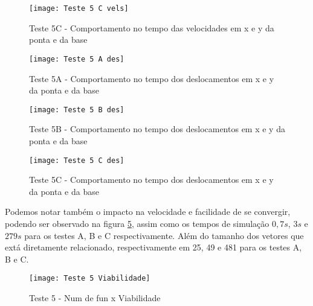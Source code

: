 \begin{figure}[!htb]
    \begin{center}
    \caption{Teste 5C - Comportamento no tempo das velocidades em x e y da ponta e da base}
    \texttt{[image: Teste 5 C vels]}
    \label{fig:t_5c_vels}
    \end{center}
\end{figure}

\begin{figure}[!htb]
    \begin{center}
    \caption{Teste 5A - Comportamento no tempo dos deslocamentos em x e y da ponta e da base}
    \texttt{[image: Teste 5 A des]}
    \label{fig:t_5a_des}
    \end{center}
\end{figure}

\begin{figure}[!htb]
    \begin{center}
    \caption{Teste 5B - Comportamento no tempo dos deslocamentos em x e y da ponta e da base}
    \texttt{[image: Teste 5 B des]}
    \label{fig:t_5b_des}
    \end{center}
\end{figure}

\begin{figure}[!htb]
    \begin{center}
    \caption{Teste 5C - Comportamento no tempo dos deslocamentos em x e y da ponta e da base}
    \texttt{[image: Teste 5 C des]}
    \label{fig:t_5c_des}
    \end{center}
\end{figure}

Podemos notar também o impacto na velocidade e facilidade de se convergir, podendo ser observado na figura \ref{fig:t_5_viab}, assim
como os tempos de simulação $0,7 s$, $3 s$ e $279 s$ para os testes A, B e C respectivamente. Além do tamanho dos vetores que extá diretamente relacionado,
respectivamente em 25, 49 e 481 para os testes A, B e C.

\begin{figure}[!htb]
    \begin{center}
    \caption{Teste 5 - Num de fun x Viabilidade}
    \texttt{[image: Teste 5 Viabilidade]}
    \label{fig:t_5_viab}
    \end{center}
\end{figure}

